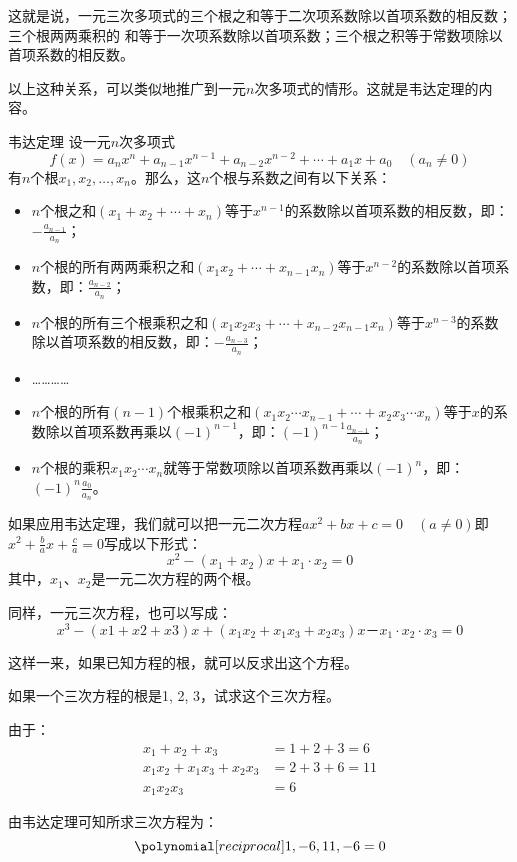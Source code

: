 这就是说，一元三次多项式的三个根之和等于二次项系数除以首项系数的相反数；三个根两两乘积的
和等于一次项系数除以首项系数；三个根之积等于常数项除以首项系数的相反数。

以上这种关系，可以类似地推广到一元$n$次多项式的情形。这就是韦达定理的内容。

\begin{blk}{韦达定理}
设一元$n$次多项式$$f(x)=a_nx^n+a_{n-1}x^{n-1}+a_{n-2}x^{n-2}+\cdots+a_1x+a_0\quad (a_n\ne 0)$$
有$n$个根$x_1,x_2,\ldots,x_n$。那么，这$n$个根与系数之间有以下关系：
\begin{itemize}
    \item $n$个根之和$(x_1+x_2+\cdots+x_n)$等于$x^{n-1}$的系数除以首项系数的相反数，即：$
    -\frac{a_{n-1}}{a_n}$；
    \item $n$个根的所有两两乘积之和$(x_1x_2+\cdots+x_{n-1}x_n)$等于$x^{n-2}$的系数除以首项系数，即：$
    \frac{a_{n-2}}{a_n}$；
    \item $n$个根的所有三个根乘积之和$(x_1x_2x_3+\cdots+x_{n-2}x_{n-1}x_n)$等于$x^{n-3}$的系数除以首项系数的相反数，即：$-\frac{a_{n-3}}{a_n}$；
    \item …………
    \item $n$个根的所有$(n-1)$个根乘积之和$(x_1x_2\cdots x_{n-1} +\cdots+ x_2x_3\cdots x_n)$等于$x$的系数除以首项系数再乘以$(-1)^{n-1}$，即：$ (-1)^{n-1}\frac{a_{n-1}}{a_n}$；
    \item $n$个根的乘积$x_1x_2\cdots x_n$就等于常数项除以首项系数再乘以$(-1)^{n}$，即：$ (-1)^{n}\frac{a_{0}}{a_n}$。
\end{itemize}
\end{blk}

如果应用韦达定理，我们就可以把一元二次方程$ax^2+bx+c=0\quad (a\ne 0)$即 $x^2+\frac{b}{a}x+\frac{c}{a}=0$写成以下形式：
\[x^2- (x_1+x_2) x+x_1\cdot x_2=0\]
其中，$x_1$、$x_2$是一元二次方程的两个根。

同样，一元三次方程，也可以写成：
\[x^3- (x1+x2+x3) x+ (x_1x_2+x_1x_3+x_2x_3) x
－x_1\cdot x_2\cdot x_3=0\]

这样一来，如果已知方程的根，就可以反求出这个方程。

\begin{example}
    如果一个三次方程的根是1, 2, 3，试求这个三次方程。
\end{example}

\begin{solution}
由于：\[\begin{split}
    x_1+x_2+x_3 &=1+2+3=6\\
    x_1x_2+x_1x_3+x_2x_3&=2+3+6=11\\
    x_1x_2x_3&=6
\end{split}\]

由韦达定理可知所求三次方程为：
\[\poly{1,-6,11,-6}=0\]
\end{solution}

